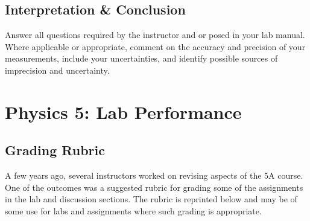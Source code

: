 \section{Interpretation \& Conclusion}
Answer all questions required by the instructor and or posed in your lab manual. Where applicable or appropriate, comment on the accuracy and precision of your measurements, include your uncertainties, and identify possible sources of imprecision and uncertainty.

\addtocounter{lab}{1}
\chapter{Physics 5: Lab Performance}
\section{Grading Rubric}
A few years ago, several instructors worked on revising aspects of the 5A course. One of the outcomes was a suggested rubric for grading some of the assignments in the lab and discussion sections. The rubric is reprinted below and may be of some use for labs and assignments where such grading is appropriate.
